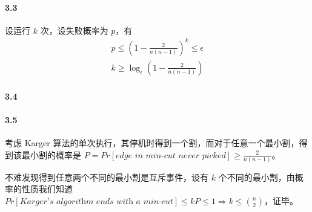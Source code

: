 \documentclass[12pt, a4paper, oneside]{ctexart}
\begin{document}
	\paragraph{3.3}
	设运行 $k$ 次，设失败概率为 $p$，有 $$\begin{aligned}
		p\leq(1-\frac{2}{n(n-1)})^k\leq \epsilon\\
		k\geq \log_\epsilon (1-\frac{2}{n(n-1)})
	\end{aligned}$$
	
	\paragraph{3.4}
	
	\paragraph{3.5}
	考虑 Karger 算法的单次执行，其停机时得到一个割，而对于任意一个最小割，得到该最小割的概率是 $P=Pr[\textit{edge in  min-cut never picked}]\geq \frac{2}{n(n-1)}$。
	
	不难发现得到任意两个不同的最小割是互斥事件，设有 $k$ 个不同的最小割，由概率的性质我们知道 $Pr[\textit{Karger's algorithm ends with a min-cut}]\leq kP\leq 1 \Rightarrow k \leq {n\choose 2}$，证毕。
	
\end{document}
